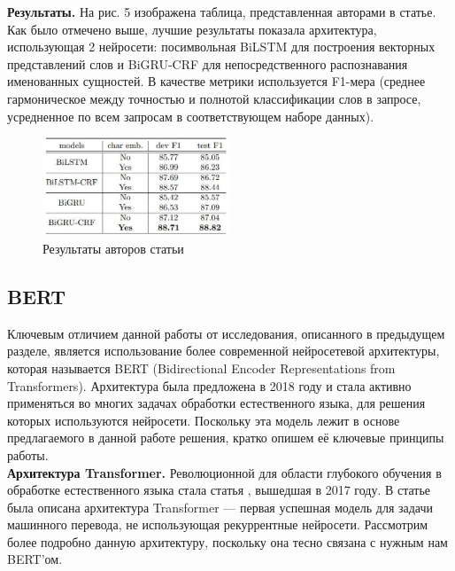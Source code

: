 \documentclass[12pt,a4paper]{article}
\begin{document}
\textbf{Результаты.} На рис. 5 изображена таблица, представленная авторами в статье. Как было отмечено выше, лучшие результаты показала архитектура, использующая 2 нейросети: посимвольная BiLSTM для построения векторных представлений слов и BiGRU-CRF для непосредственного распознавания именованных сущностей. В качестве метрики используется F1-мера (среднее гармоническое между точностью и полнотой классификации слов в запросе, усредненное по всем запросам в соответствующем наборе данных).

\begin{figure}[H]
\begin{center}
  \includegraphics[width=0.5\textwidth]{tab.jpg}
  \caption{Результаты авторов статьи}
\end{center}
\end{figure}

\subsection{BERT}

Ключевым отличием данной работы от исследования, описанного в предыдущем разделе, является использование более современной нейросетевой архитектуры, которая называется BERT (Bidirectional Encoder Representations from Transformers). Архитектура была предложена\cite{bert} в 2018 году и стала активно применяться во многих задачах обработки естественного языка, для решения которых используются нейросети. Поскольку эта модель лежит в основе предлагаемого в данной работе решения, кратко опишем её ключевые принципы работы.\\

\textbf{Архитектура Transformer.} Революционной для области глубокого обучения в обработке естественного языка стала статья \cite{transformer}, вышедшая в 2017 году. В статье была описана архитектура Transformer --- первая успешная модель для задачи машинного перевода, не использующая рекуррентные нейросети. Рассмотрим более подробно данную архитектуру, поскольку  она тесно связана с нужным нам BERT'ом.
\end{document}
